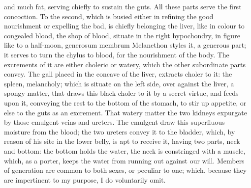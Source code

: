 {and much fat, serving chiefly to sustain the guts. All these parts
serve the first concoction. To the second, which is busied either in
refining the good nourishment or expelling the bad, is chiefly
belonging the liver, like in colour to congealed blood, the shop of
blood, situate in the right hypochondry, in figure like to a half-moon,
generosum membrum Melancthon styles it, a generous part; it serves to
turn the chylus to blood, for the nourishment of the body. The
excrements of it are either choleric or watery, which the other
subordinate parts convey. The gall placed in the concave of the liver,
extracts choler to it: the spleen, melancholy; which is situate on the
left side, over against the liver, a spongy matter, that draws this
black choler to it by a secret virtue, and feeds upon it, conveying the
rest to the bottom of the stomach, to stir up appetite, or else to the
guts as an excrement. That watery matter the two kidneys expurgate by
those emulgent veins and ureters. The emulgent draw this superfluous
moisture from the blood; the two ureters convey it to the bladder,
which, by reason of his site in the lower belly, is apt to receive it,
having two parts, neck and bottom: the bottom holds the water, the neck
is constringed with a muscle, which, as a porter, keeps the water from
running out against our will.
Members of generation are common to both sexes, or peculiar to one;
which, because they are impertinent to my purpose, I do voluntarily
omit.
}
